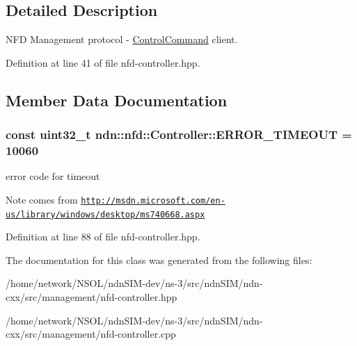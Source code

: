 \subsection{Detailed Description}
N\+FD Management protocol -\/ \hyperlink{classndn_1_1nfd_1_1ControlCommand}{Control\+Command} client. 

Definition at line 41 of file nfd-\/controller.\+hpp.



\subsection{Member Data Documentation}
\subsubsection[{\texorpdfstring{E\+R\+R\+O\+R\+\_\+\+T\+I\+M\+E\+O\+UT}{ERROR\_TIMEOUT}}]{\setlength{\rightskip}{0pt plus 5cm}const uint32\+\_\+t ndn\+::nfd\+::\+Controller\+::\+E\+R\+R\+O\+R\+\_\+\+T\+I\+M\+E\+O\+UT = 10060\hspace{0.3cm}{\ttfamily [static]}}\hypertarget{classndn_1_1nfd_1_1Controller_a0d52c3cd0677c88e2bb519510a4e50a3}{}\label{classndn_1_1nfd_1_1Controller_a0d52c3cd0677c88e2bb519510a4e50a3}


error code for timeout 

\begin{DoxyNote}{Note}
comes from \href{http://msdn.microsoft.com/en-us/library/windows/desktop/ms740668.aspx}{\tt http\+://msdn.\+microsoft.\+com/en-\/us/library/windows/desktop/ms740668.\+aspx} 
\end{DoxyNote}


Definition at line 88 of file nfd-\/controller.\+hpp.



The documentation for this class was generated from the following files\+:\begin{DoxyCompactItemize}
\item 
/home/network/\+N\+S\+O\+L/ndn\+S\+I\+M-\/dev/ns-\/3/src/ndn\+S\+I\+M/ndn-\/cxx/src/management/nfd-\/controller.\+hpp\item 
/home/network/\+N\+S\+O\+L/ndn\+S\+I\+M-\/dev/ns-\/3/src/ndn\+S\+I\+M/ndn-\/cxx/src/management/nfd-\/controller.\+cpp\end{DoxyCompactItemize}
